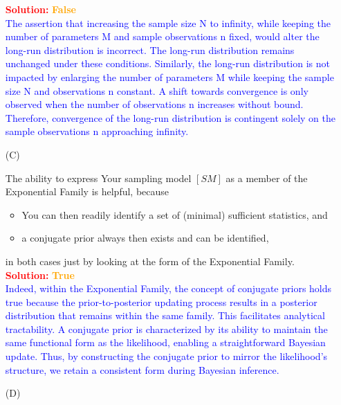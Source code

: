 \documentclass[12pt]{article}
\begin{document}
\begin{itemize}
 \textcolor{red}{\textbf{Solution:}} \textbf{\textcolor{orange}{False}} \\
\textcolor{blue}{The assertion that increasing the sample size N to infinity, while keeping the number of parameters M and sample observations n fixed, would alter the long-run distribution is incorrect. The long-run distribution remains unchanged under these conditions. Similarly, the long-run distribution is not impacted by enlarging the number of parameters M while keeping the sample size N and observations n constant. A shift towards convergence is only observed when the number of observations n increases without bound. Therefore, convergence of the long-run distribution is contingent solely on the sample observations n approaching infinity.}
\\

\item[(C)]

The ability to express Your sampling model $[ SM ]$ as a member of the
Exponential Family is helpful, because


\begin{itemize}

\item

You can then readily identify a set of (minimal) sufficient statistics, and

\item

a conjugate prior always then exists and can be identified, 

\end{itemize}

in both cases just by looking at the form of the Exponential Family. 
\\


\textcolor{red}{\textbf{Solution:}} \textbf{\textcolor{orange}{True}} \\
\textcolor{blue}{Indeed, within the Exponential Family, the concept of conjugate priors holds true because the prior-to-posterior updating process results in a posterior distribution that remains within the same family. This facilitates analytical tractability. A conjugate prior is characterized by its ability to maintain the same functional form as the likelihood, enabling a straightforward Bayesian update. Thus, by constructing the conjugate prior to mirror the likelihood's structure, we retain a consistent form during Bayesian inference.}

\item[(D)]


\end{itemize}
\end{document}
